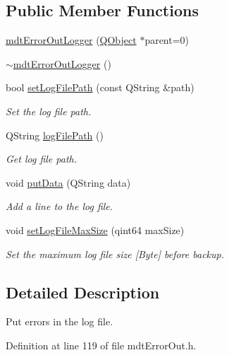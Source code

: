 \subsection*{Public Member Functions}
\begin{DoxyCompactItemize}
\item 
\hyperlink{classmdt_error_out_logger_a323c048fd3a5107e8b28a7c7a9c4cf9d}{mdt\-Error\-Out\-Logger} (\hyperlink{class_q_object}{Q\-Object} $\ast$parent=0)
\item 
\hyperlink{classmdt_error_out_logger_a3e2b53cbb5b057da952f71bfc6cdd785}{$\sim$mdt\-Error\-Out\-Logger} ()
\item 
bool \hyperlink{classmdt_error_out_logger_a6e68b905a6c1f9452523b8a0e336ce1e}{set\-Log\-File\-Path} (const Q\-String \&path)
\begin{DoxyCompactList}\small\item\em Set the log file path. \end{DoxyCompactList}\item 
Q\-String \hyperlink{classmdt_error_out_logger_ac0d0bcca2d181c722f2ee5d024de5d57}{log\-File\-Path} ()
\begin{DoxyCompactList}\small\item\em Get log file path. \end{DoxyCompactList}\item 
void \hyperlink{classmdt_error_out_logger_a4ba2f6f02c9c22171c4d04a8065aafd8}{put\-Data} (Q\-String data)
\begin{DoxyCompactList}\small\item\em Add a line to the log file. \end{DoxyCompactList}\item 
void \hyperlink{classmdt_error_out_logger_a2f7158e61fd961e35f589bb2d1f51e03}{set\-Log\-File\-Max\-Size} (qint64 max\-Size)
\begin{DoxyCompactList}\small\item\em Set the maximum log file size \mbox{[}Byte\mbox{]} before backup. \end{DoxyCompactList}\end{DoxyCompactItemize}


\subsection{Detailed Description}
Put errors in the log file. 

Definition at line 119 of file mdt\-Error\-Out.\-h.



